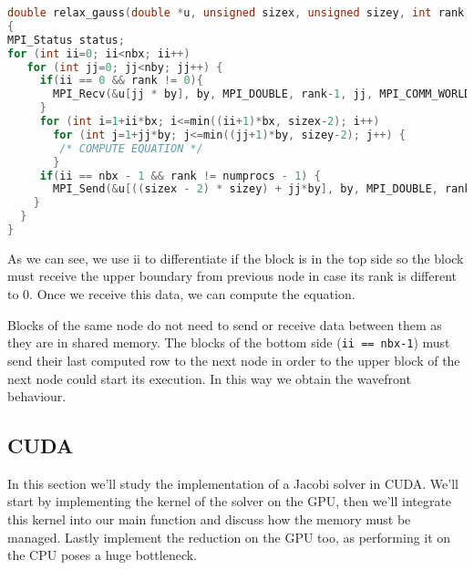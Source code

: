 \documentclass[a4paper, 10pt]{article}
\begin{document}
\begin{lstlisting}[language=c, caption={Communications between nodes Gauss-Seidel inside kernel}, label={lst:gauss-mpi-kernel}]
double relax_gauss(double *u, unsigned sizex, unsigned sizey, int rank, int numprocs) //rank and numprocs passed as parameters
{
MPI_Status status;
for (int ii=0; ii<nbx; ii++)
   for (int jj=0; jj<nby; jj++) {
     if(ii == 0 && rank != 0){
       MPI_Recv(&u[jj * by], by, MPI_DOUBLE, rank-1, jj, MPI_COMM_WORLD, &status);
     }
     for (int i=1+ii*bx; i<=min((ii+1)*bx, sizex-2); i++) 
       for (int j=1+jj*by; j<=min((jj+1)*by, sizey-2); j++) {
        /* COMPUTE EQUATION */
       }
     if(ii == nbx - 1 && rank != numprocs - 1) {
       MPI_Send(&u[((sizex - 2) * sizey) + jj*by], by, MPI_DOUBLE, rank+1, jj, MPI_COMM_WORLD);
    }
  } 
}
\end{lstlisting}

As we can see, we use ii to differentiate if the block is in the top side so the block must receive the upper boundary from previous node in case its rank is different to 0. Once we receive this data, we can compute the equation.

Blocks of the same node do not need to send or receive data between them as they are in shared memory. The blocks of the bottom side (\texttt{ii == nbx-1}) must send their last computed row to the next node in order to the upper block of the next node could start its execution. In this way we obtain the wavefront behaviour.


\clearpage

\subsection{CUDA}

In this section we'll study the implementation of a Jacobi solver in CUDA. We'll start by implementing 
the kernel of the solver on the GPU, then we'll integrate this kernel into our main function and 
discuss how the memory must be managed. Lastly implement the reduction on the GPU too, as performing it
on the CPU poses a huge bottleneck.
\end{document}
